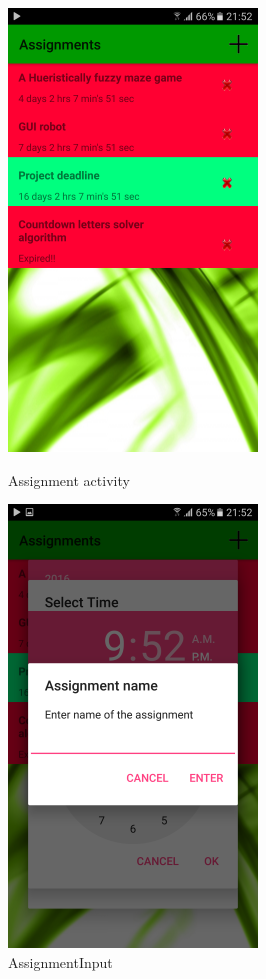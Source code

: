 \begin{figure}[!tbp]
	\begin{minipage}[b]{0.47\textwidth}
		\includegraphics{img/assignment.png}
		\caption{Assignment activity}
	\end{minipage}
	\hfill
	\begin{minipage}[b]{0.47\textwidth}
		\includegraphics{img/assignmentinput.png}
		\caption{AssignmentInput}
	\end{minipage}
\end{figure}

